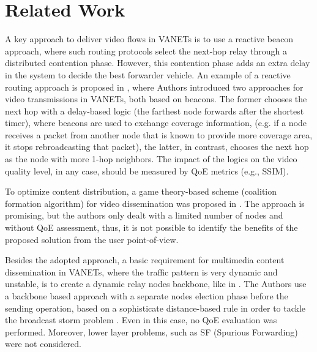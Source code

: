 \documentclass{acm_proc_article-sp}
\begin{document}
\section{Related Work}
\label{related}

A key approach to deliver video flows in VANETs is to use a reactive beacon approach, where such routing protocols select the next-hop relay through a distributed contention phase. However, this contention phase adds an extra delay in the system to decide the best forwarder vehicle.
An example of a reactive routing approach is proposed in \cite{torres2014v2x}, where Authors introduced two approaches for video transmissions in VANETs, both based on beacons. The former chooses the next hop with a delay-based logic (the farthest node forwards after the shortest timer), where beacons are used to exchange coverage information, (e.g. if a node receives a packet from another node that is known to provide more coverage area, it stops rebroadcasting that packet), the latter, in contrast, chooses the next hop as the node with more 1-hop neighbors. The impact of the logics on the video quality level, in any case, should be measured by QoE metrics (e.g., SSIM).

To optimize content distribution, a game theory-based scheme  (coalition formation algorithm) for video dissemination was proposed in \cite{MultimediaGameTheory}. The approach is promising, but the authors only dealt with a limited number of nodes and without QoE assessment, thus, it is not possible to identify the benefits of the proposed solution from the user point-of-view.

Besides the adopted approach, a basic requirement for multimedia content dissemination in VANETs, where the traffic pattern is very dynamic and unstable, is to create a dynamic relay nodes backbone, like in \cite{rezende2014receiver}. The Authors use a backbone based approach with a separate nodes election phase before the sending operation, based on a sophisticate distance-based rule in order to tackle the broadcast storm problem \cite{StormNew}. Even in this case, no QoE evaluation was performed. Moreover, lower layer problems, such as SF (Spurious Forwarding) were not considered.
\end{document}

